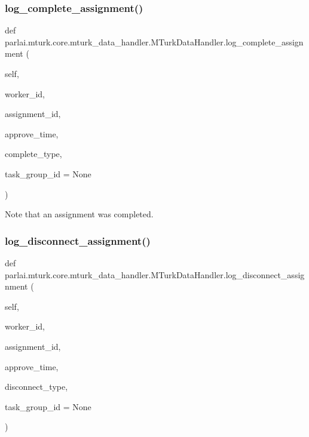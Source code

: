 \subsubsection{\texorpdfstring{log\+\_\+complete\+\_\+assignment()}{log\_complete\_assignment()}}
{\footnotesize\ttfamily def parlai.\+mturk.\+core.\+mturk\+\_\+data\+\_\+handler.\+M\+Turk\+Data\+Handler.\+log\+\_\+complete\+\_\+assignment (\begin{DoxyParamCaption}\item[{}]{self,  }\item[{}]{worker\+\_\+id,  }\item[{}]{assignment\+\_\+id,  }\item[{}]{approve\+\_\+time,  }\item[{}]{complete\+\_\+type,  }\item[{}]{task\+\_\+group\+\_\+id = {\ttfamily None} }\end{DoxyParamCaption})}

\begin{DoxyVerb}Note that an assignment was completed.
\end{DoxyVerb}
 \mbox{\label{classparlai_1_1mturk_1_1core_1_1mturk__data__handler_1_1MTurkDataHandler_ac4dc07d7412b426c29678b517daf6094}} 
\subsubsection{\texorpdfstring{log\+\_\+disconnect\+\_\+assignment()}{log\_disconnect\_assignment()}}
{\footnotesize\ttfamily def parlai.\+mturk.\+core.\+mturk\+\_\+data\+\_\+handler.\+M\+Turk\+Data\+Handler.\+log\+\_\+disconnect\+\_\+assignment (\begin{DoxyParamCaption}\item[{}]{self,  }\item[{}]{worker\+\_\+id,  }\item[{}]{assignment\+\_\+id,  }\item[{}]{approve\+\_\+time,  }\item[{}]{disconnect\+\_\+type,  }\item[{}]{task\+\_\+group\+\_\+id = {\ttfamily None} }\end{DoxyParamCaption})}


